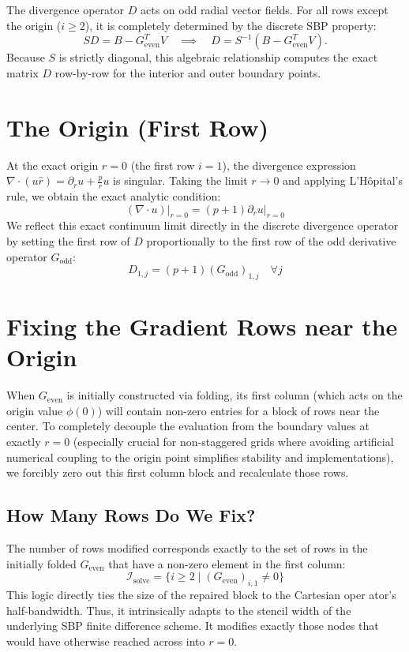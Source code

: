 \documentclass[reprint,amsmath,amssymb,aps]{revtex4-2}
\begin{document}
The divergence operator $D$ acts on odd radial vector fields. For all rows except the origin ($i \ge 2$), it is completely determined by the discrete SBP property:
\begin{equation}
    S D = B - G_{\text{even}}^T V \quad \implies \quad D = S^{-1} (B - G_{\text{even}}^T V).
\end{equation}
Because $S$ is strictly diagonal, this algebraic relationship computes the exact matrix $D$ row-by-row for the interior and outer boundary points.

\section{The Origin (First Row)}
At the exact origin $r=0$ (the first row $i=1$), the divergence expression $\nabla \cdot (u \hat{r}) = \partial_r u + \frac{p}{r} u$ is singular. Taking the limit $r \to 0$ and applying L'H\^opital's rule, we obtain the exact analytic condition:
\begin{equation}
    (\nabla \cdot u)\big|_{r=0} = (p + 1) \partial_r u\big|_{r=0}
\end{equation}
We reflect this exact continuum limit directly in the discrete divergence operator by setting the first row of $D$ proportionally to the first row of the odd derivative operator $G_{\text{odd}}$:
\begin{equation}
    D_{1, j} = (p+1) (G_{\text{odd}})_{1,j} \quad \forall j
\end{equation}

\section{Fixing the Gradient Rows near the Origin}
When $G_{\text{even}}$ is initially constructed via folding, its first column (which acts on the origin value $\phi(0)$) will contain non-zero entries for a block of rows near the center. To completely decouple the evaluation from the boundary values at exactly $r=0$ (especially crucial for non-staggered grids where avoiding artificial numerical coupling to the origin point simplifies stability and implementations), we forcibly zero out this first column block and recalculate those rows.

\subsection{How Many Rows Do We Fix?}
The number of rows modified corresponds exactly to the set of rows in the initially folded $G_{\text{even}}$ that have a non-zero element in the first column:
\begin{equation}
    \mathcal{I}_{\text{solve}} = \{ i \ge 2 \mid (G_{\text{even}})_{i,1} \neq 0 \}
\end{equation}
This logic directly ties the size of the repaired block to the Cartesian oper   ator's half-bandwidth. Thus, it intrinsically adapts to the stencil width of the underlying SBP finite difference scheme. It modifies exactly those nodes that would have otherwise reached across into $r=0$.
\end{document}
